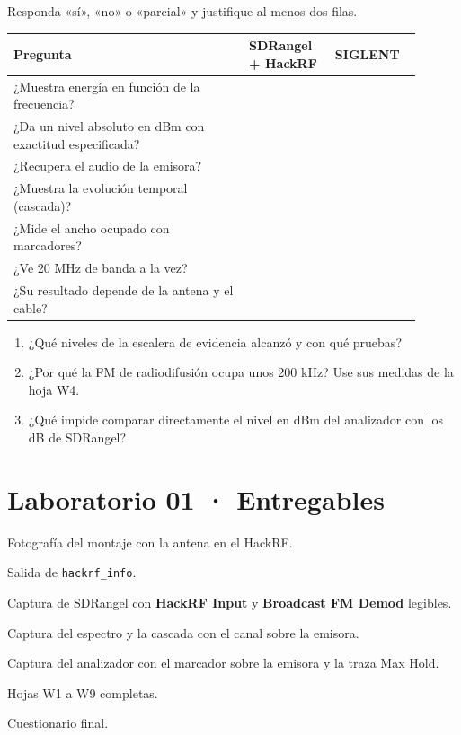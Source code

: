 Responda «sí», «no» o «parcial» y justifique al menos dos filas.
\par\noindent\begin{tabular}{@{}>{\raggedright\arraybackslash}p{0.52\linewidth}>{\raggedright\arraybackslash}p{0.19\linewidth}>{\raggedright\arraybackslash}p{0.19\linewidth}@{}}
\toprule
\textbf{Pregunta} & \textbf{SDRangel + HackRF} & \textbf{SIGLENT} \\
\midrule
¿Muestra energía en función de la frecuencia? & & \\ \cmidrule[0.3pt]{1-3}
¿Da un nivel absoluto en dBm con exactitud especificada? & & \\ \cmidrule[0.3pt]{1-3}
¿Recupera el audio de la emisora? & & \\ \cmidrule[0.3pt]{1-3}
¿Muestra la evolución temporal (cascada)? & & \\ \cmidrule[0.3pt]{1-3}
¿Mide el ancho ocupado con marcadores? & & \\ \cmidrule[0.3pt]{1-3}
¿Ve 20 MHz de banda a la vez? & & \\ \cmidrule[0.3pt]{1-3}
¿Su resultado depende de la antena y el cable? & & \\
\bottomrule
\end{tabular}\par\medskip
{}

\begin{enumerate}
  \item ¿Qué niveles de la escalera de evidencia alcanzó y con qué pruebas?
  \item ¿Por qué la FM de radiodifusión ocupa unos 200 kHz? Use sus medidas de la hoja W4.
  \item ¿Qué impide comparar directamente el nivel en dBm del analizador con los dB de SDRangel?
\end{enumerate}

\section{Laboratorio 01 · Entregables}
\label{sec:b-entregaw}

\begin{checklist}
  \item Fotografía del montaje con la antena en el HackRF.
  \item Salida de \texttt{hackrf\_info}.
  \item Captura de SDRangel con \textbf{HackRF Input} y \textbf{Broadcast FM Demod} legibles.
  \item Captura del espectro y la cascada con el canal sobre la emisora.
  \item Captura del analizador con el marcador sobre la emisora y la traza Max Hold.
  \item Hojas W1 a W9 completas.
  \item Cuestionario final.
\end{checklist}

